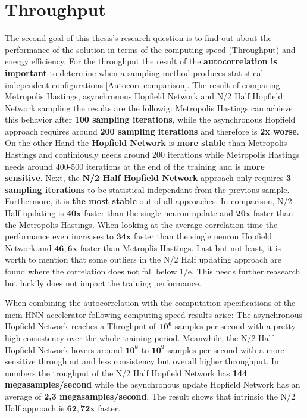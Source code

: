 \section{Throughput}

The second goal of this thesis's research question is to find out about the performance of the solution in terms of the 
computing speed (Throughput) and energy efficiency. 
For the throughput the result of the \textbf{autocorrelation is important} to determine when a sampling method produces statistical independent configurations \ref{Autocorr comparison}.
The result of comparing Metropolis Hastings, asynchronous Hopfield Network and N/2 Half Hopfield Network sampling the results are the followig:
Metropolis Hastings can achieve this behavior after \textbf{100 sampling iterations}, while the asynchronous Hopfield approach requires around \textbf{200 sampling iterations} and therefore 
is \textbf{2x worse}. On the other Hand the \textbf{Hopfield Network} is \textbf{more stable} than Metropolis Hastings and continiously needs around 200 iterations 
while Metropolis Hastings needs around 400-500 iterations at the end of the training and is \textbf{more sensitive}. 
Next, the \textbf{N/2 Half Hopfield Network} approach only requires \textbf{3 sampling iterations} to be statistical independant from the previous sample.
Furthermore, it is \textbf{the most stable} out of all approaches. In comparison, N/2 Half updating is \(\mathbf{40x}\) faster than the single neuron
update and \(\mathbf{20x}\) faster than the Metropolis Hastings. 
When looking at the average correlation time the performance even increases to \(\mathbf{34x}\) faster than the single neuron Hopfield Network and \(\mathbf{46,6x}\)
faster than Metroplis Hastings.
Last but not least, it is worth to mention that some outliers in the N/2 Half updating approach are found where 
the correlation does not fall below 1/e. This needs further reasearch but luckily does not impact the training performance. 

When combining the autocorrelation with the computation specifications of the \ac{mem-HNN} accelerator following computing speed results arise:
The asynchronous Hopfield Network reaches a Throghput of \(\mathbf{10^6}\) samples per second with a pretty high
consistency over the whole training period. Meanwhile, the N/2 Half Hopfield Network 
hovers around \(\mathbf{10^8}\) to \(\mathbf{10^9}\) samples per second with a more sensitive throughput and less consistency 
but overall higher throughput.
In numbers the troughput of the N/2 Half Hopfield Network has \textbf{144 megasamples/second} while the asynchronous update Hopfield Network has an average of \textbf{2,3 megasamples/second}.
The result shows that intrinsic the N/2 Half approach is \(\mathbf{62,72x}\) faster. 

